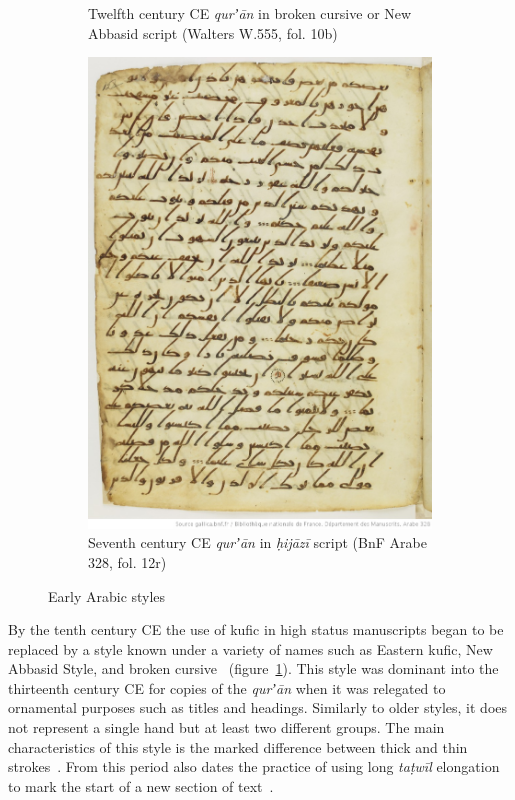 \begin{figure}[h!tp]
\begin{subfigure}[t]{.48\textwidth}
		\caption{Twelfth century CE \emph{qurʼān} in broken cursive or New Abbasid script (Walters W.555, fol. 10b)}
                \label{fig:ara_broken}
        \end{subfigure}
	\hfill
	\begin{subfigure}[t]{.48\columnwidth}
                \includegraphics[width=\textwidth]{images/Coran__btv1b8415207g_31.jpeg}
		\caption{Seventh century CE \emph{qurʼān} in \emph{ḥijāzī} script (BnF Arabe 328, fol. 12r)}
                \label{fig:ara_hijazi}
        \end{subfigure}
        \caption{Early Arabic styles}
\end{figure}

By the tenth century CE the use of kufic in high status manuscripts began to be
replaced by a style known under a variety of names such as Eastern kufic, New
Abbasid Style, and broken cursive~\cite[pg. 144]{blair2006islamic}
(figure~\ref{fig:ara_broken}). This style was dominant into the thirteenth
century CE for copies of the \emph{qurʼān} when it was relegated to ornamental
purposes such as titles and headings. Similarly to older styles, it does not
represent a single hand but at least two different groups. The main
characteristics of this style is the marked difference between thick and thin
strokes~\cite[pg. 167-168]{gacek2009arabic}. From this period also dates the
practice of using long \emph{taṭwīl} elongation to mark the start of a new
section of text~\cite[pg. 165]{blair2006islamic}.

